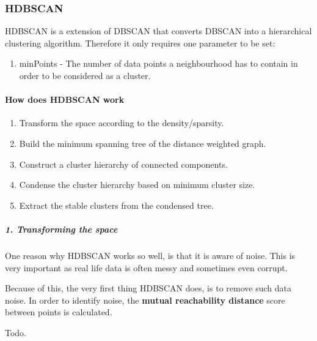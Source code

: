 \subsubsection{HDBSCAN}

\iffalse
HDBSCAN is a hierarchical density-based clustering algorithm \cite{McInnes2017}.
It extends the well known [insert citation] DBSCAN algorithm and reduces its sensitivity for clusters of varying densities.
Another important quality of HDBSCAN is, that it does not need to know the number of clusters up front.
\fi

HDBSCAN is a extension of DBSCAN that converts DBSCAN into a hierarchical clustering algorithm.
Therefore it only requires one parameter to be set:
\begin{enumerate}
    \item minPoints - The number of data points a neighbourhood has to contain in order to be considered as a cluster.
\end{enumerate}

\paragraph{How does HDBSCAN work}
\begin{enumerate}
    \item Transform the space according to the density/sparsity.
    \item Build the minimum spanning tree of the distance weighted graph.
    \item Construct a cluster hierarchy of connected components.
    \item Condense the cluster hierarchy based on minimum cluster size.
    \item Extract the stable clusters from the condensed tree.
\end{enumerate}

\subparagraph{1. Transforming the space}
One reason why HDBSCAN works so well, is that it is aware of noise.
This is very important as real life data is often messy and sometimes even corrupt.

Because of this, the very first thing HDBSCAN does, is to remove such data noise.
In order to identify noise, the \textbf{mutual reachability distance} score between
points is calculated.



Todo.
